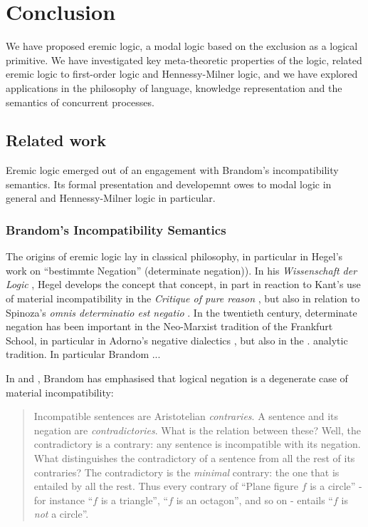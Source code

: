 \section{Conclusion}\label{conclusion}

\NI We have proposed eremic logic, a modal logic based on the
exclusion as a logical primitive. We have investigated key
meta-theoretic properties of the logic, related eremic logic to
first-order logic and Hennessy-Milner logic, and we have explored
applications in the philosophy of language, knowledge representation
and the semantics of concurrent processes.  

\subsection{Related work} 

Eremic logic emerged out of an engagement with Brandom's
incompatibility semantics.  Its formal presentation and developemnt
owes to modal logic in general and Hennessy-Milner logic in
particular.

\subsubsection{Brandom's Incompatibility Semantics}

The origins of eremic logic lay in classical philosophy, in particular
in Hegel's work on ``bestimmte Negation'' (determinate negation)).  In
his \emph{Wissenschaft der Logic} \cite{HegelGWF:wisdlog}, Hegel
develops the concept that concept, in part in reaction to Kant's use
of material incompatibility in the \emph{Critique of pure reason}
\cite{KantI:kdrv}, but also in relation to Spinoza's \emph{omnis
  determinatio est negatio} \cite{???}.  In the twentieth century,
determinate negation has been important in the Neo-Marxist tradition
of the Frankfurt School, in particular in Adorno's negative dialectics
\cite{AdornoTW:negdia}, but also in the .
 analytic tradition. In particular Brandom ...


In \cite{brandom2} and \cite{brandom}, Brandom has emphasised that
logical negation is a degenerate case of material incompatibility:

\begin{quote}
Incompatible sentences are Aristotelian \emph{contraries}. A sentence
and its negation are \emph{contradictories}. What is the relation
between these? Well, the contradictory is a contrary: any sentence is
incompatible with its negation. What distinguishes the contradictory
of a sentence from all the rest of its contraries? The contradictory
is the \emph{minimal} contrary: the one that is entailed by all the
rest. Thus every contrary of ``Plane figure $f$ is a circle'' - for
instance ``$f$ is a triangle'', ``$f$ is an octagon'', and so on -
entails ``$f$ is \emph{not} a circle''.
\end{quote}

